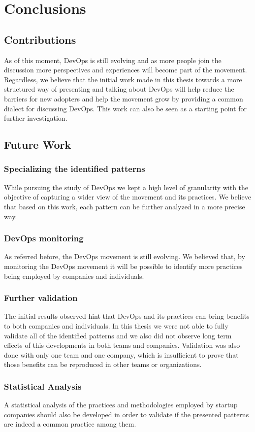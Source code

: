 \chapter{ Conclusions } \label{chap:conclusion}
    \section{Contributions}
    As of this moment, DevOps is still evolving and as more people join the discussion more perspectives and experiences will become part of the movement. Regardless, we believe that the initial work made in this thesis towards a more structured way of presenting and talking about DevOps will help reduce the barriers for new adopters and help the movement grow by providing a common dialect for discussing DevOps. This work can also be seen as a starting point for further investigation.



    \section{Future Work}
      \subsection{Specializing the identified patterns}
      While pursuing the study of DevOps we kept a high level of granularity with the objective of capturing a wider view of the movement and its practices. We believe that based on this work, each pattern can be further analyzed in a more precise way.
      \subsection{DevOps monitoring}
      As referred before, the DevOps movement is still evolving. We believed that, by monitoring the DevOps movement it will be possible to identify more practices being employed by companies and individuals.
      \subsection{Further validation}
      The initial results observed hint that DevOps and its practices can bring benefits to both companies and individuals. In this thesis we were not able to fully validate all of the identified patterns and we also did not observe long term effects of this developments in both teams and companies. Validation was also done with only one team and one company, which is insufficient to prove that those benefits can be reproduced in other teams or organizations.
      \subsection{Statistical Analysis}
      A statistical analysis of the practices and methodologies employed by startup companies should also be developed in order to validate if the presented patterns are indeed a common practice among them.